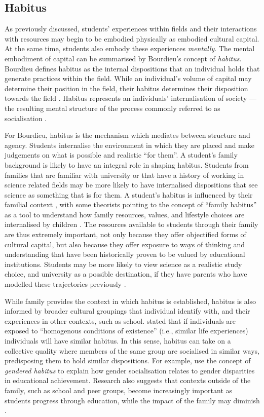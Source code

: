 \subsection{Habitus}
As previously discussed, students' experiences within fields and their interactions with resources may begin to be embodied physically as embodied cultural capital. At the same time, students also embody these experiences \textit{mentally}. The mental embodiment of capital can be summarised by Bourdieu's concept  of \textit{habitus}. Bourdieu defines habitus as the internal dispositions that an individual holds that generate practices within the field. While an individual's volume of capital may determine their position in the field, their habitus determines their disposition towards the field \citep{bourdieu1992invitation}. Habitus represents an individuals' internalisation of society --- the resulting mental structure of the process commonly referred to as socialisation \citep{Nash1999}.

For Bourdieu, habitus is the mechanism which mediates between structure and agency. Students internalise the environment in which they are placed and make judgements on what is possible and realistic ``for them''. A student's family background is likely to have an integral role in shaping habitus. Students from families that are familiar with university or that have a history of working in science related fields may be more likely to have internalised dispositions that see science as something that is for them. A student's habitus is influenced by their familial context \citep{Dimaggio1982}, with some theorists pointing to the concept of ``family habitus'' as a tool to understand how family resources, values, and lifestyle choices are internalised by children \citep{Archer2012,tomanovic2004family}. The resources available to students through their family are thus extremely important, not only because they offer objectified forms of cultural capital, but also because they offer exposure to ways of thinking and understanding that have been historically proven to be valued by educational institutions. Students may be more likely to view science as a realistic study choice, and university as a possible destination, if they have parents who have modelled these trajectories previously \citep{Lyons_2006}. 

While family provides the context in which habitus is established, habitus is also informed by broader cultural groupings that individual identify with, and their experiences in other contexts, such as school. \citet[p.101]{Bourdieu1984} stated that if individuals are exposed to ``homogenous conditions of existence'' (i.e., similar life experiences) individuals will have similar habitus. In this sense, habitus can take on a collective quality where members of the same group are socialised in similar ways, predisposing them to hold similar dispositions. For example, \citet{Edgerton2014} use the concept of \textit{gendered habitus} to explain how gender socialisation relates to gender disparities in educational achievement. Research also suggests that  contexts outside of the family, such as school and peer groups, become increasingly important as students progress through education, while the impact of the family may diminish \citep{holm2011dealing}.   

